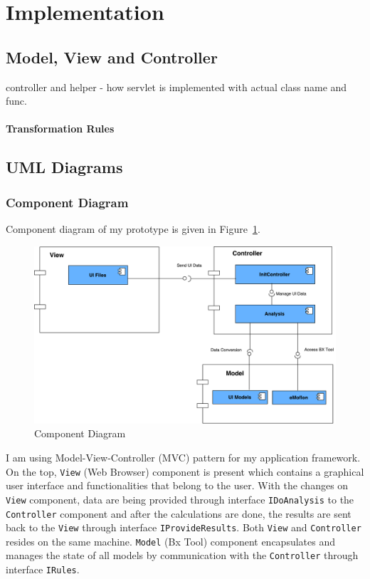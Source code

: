 \section{Implementation}\label{sec:implementation}
\subsection{Model, View and Controller}\label{subsec:MVC}
controller and helper - how servlet is implemented with actual class name and func.
\paragraph{Transformation Rules}

\subsection{UML Diagrams}\label{subsec:umldiagrams}
\subsubsection{Component Diagram}\label{subsubsec:component}
Component diagram of my prototype is given in Figure~\ref{fig:Component_Diagram}.
\begin{figure}
	\includegraphics[width=1\textwidth]{figures/Component_Diagram}
	\caption{Component Diagram}
	\label{fig:Component_Diagram}
\end{figure}

I am using Model-View-Controller (MVC) pattern for my application framework. 
On the top, \texttt{View} (Web Browser) component is present which contains a graphical user interface and functionalities that belong to the user. With the changes on \texttt{View} component, data are being provided through interface \texttt{IDoAnalysis} to the \texttt{Controller} component and after the calculations are done, the results are sent back to the \texttt{View} through interface \texttt{IProvideResults}. Both \texttt{View} and \texttt{Controller} resides on the same machine. \texttt{Model} (Bx Tool) component encapsulates and manages the state of all models by communication with the \texttt{Controller} through interface \texttt{IRules}.
